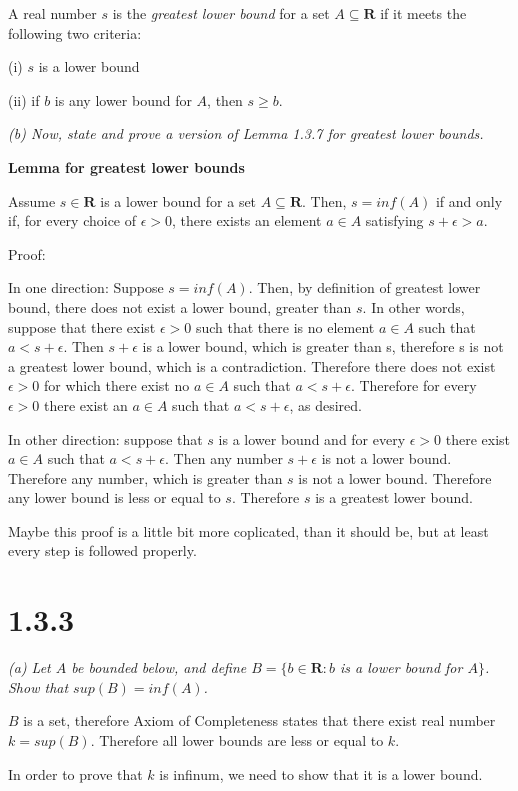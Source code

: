 \documentclass[11pt,oneside,titlepage]{book}
\begin{document}
A real number $s$ is the \textit{greatest lower bound} for a set
$A \subseteq \textbf{R}$ if it meets the following two criteria:

(i) $s$ is a lower bound

(ii) if $b$ is any lower bound for $A$, then $s \geq b$.

\textit{(b) Now, state and prove a version of Lemma 1.3.7 for greatest lower
  bounds.}

\textbf{Lemma for greatest lower bounds}

Assume $s \in \textbf{R}$ is a lower bound for a set  $A \subseteq \textbf{R}$.
Then, $s = inf(A)$ if and only if, for every choice of $\epsilon > 0$, there
exists an element $a \in A$ satisfying $s + \epsilon > a$.

Proof:

In one direction: Suppose $s = inf(A)$. Then, by definition of greatest lower
bound, there does not exist a lower bound, greater than $s$. In other words,
suppose that there exist $\epsilon > 0$ such that there is no element $a \in A$
such that $a < s + \epsilon$. Then $s + \epsilon$ is a lower bound, which is
greater than s, therefore s is not a greatest lower bound, which is a
contradiction. Therefore there does not exist $\epsilon > 0$ for which
there exist no $a \in A$ such that $a < s + \epsilon$. Therefore for
every $\epsilon > 0$ there exist an $a \in A$  such that $a < s + \epsilon$,
as desired.

In other direction: suppose that $s$ is a lower bound and for every $\epsilon
> 0$ there exist $a \in A$ such that $a < s + \epsilon$. Then any number
$s + \epsilon$ is not a lower bound. Therefore any number, which is greater
than $s$ is not a lower bound. Therefore any lower bound is less or equal to
$s$. Therefore $s$ is a greatest lower bound.

Maybe this proof is a little bit more coplicated, than it should be, but
at least every step is followed properly.

\section*{1.3.3}
\textit{(a) Let $A$ be bounded below, and define $B = \{b \in \textbf{R}:
  b $ is a lower bound for $A\}$. Show that $sup(B) = inf(A)$.}

$B$ is a set, therefore Axiom of Completeness states that there exist real
number $k = sup(B)$. Therefore all lower bounds are less or equal to $k$.

In order to prove that $k$ is infinum, we need to show that it is a lower
bound.
\end{document}
